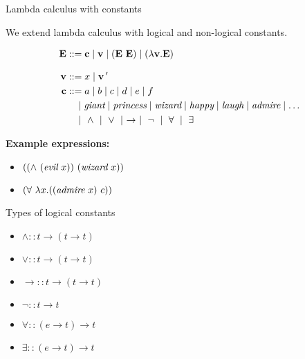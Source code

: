 \documentclass[xcolor=dvipsnames]{beamer}
\begin{document}
\begin{frame}{Lambda calculus with constants}

We extend lambda calculus with logical and non-logical constants. 

\vspace{-.6cm}

\begin{align*}
\textbf{E} & ::= \textbf{c} \mid \textbf{v} \mid (\textbf{E}\ \textbf{E}) \mid (\lambda \textbf{v} . \textbf{E})\\[2ex]
\textbf{v} & ::= x \mid \textbf{v}\,' \\
\textbf{c} & ::= a \mid b \mid c \mid d \mid e \mid f \\ 
 & \ \ \ \mid \text{\em giant} \mid \text{\em princess} \mid \text{\em wizard}
 \mid \text{\em happy} \mid \text{\em laugh} \mid \text{\em admire} \mid \ldots \\
 & \ \ \ \mid\ \land\ \mid\ \lor\ \mid\ \to\ \mid\ \lnot\ \mid\ \forall\ \mid\ \exists
\end{align*}\pause

{\bf Example expressions:}
\begin{itemize}
\item $((\land\ (\text{\em evil}\ x))\ (\text{\em wizard}\ x))$
\item $(\forall\ \lambda x.((\text{\em admire}\ x)\ c))$
\end{itemize}
\end{frame}

\begin{frame}{Types of logical constants}

\begin{itemize}
\item $\land :: t\to (t\to t)$
\item $\lor :: t\to (t\to t)$
\item $\to :: t\to (t\to t)$
\item $\lnot :: t\to t$
\item $\forall :: (e\to t)\to t$ 
\item $\exists :: (e\to t)\to t$ 
\end{itemize}
\end{frame}
\end{document}
